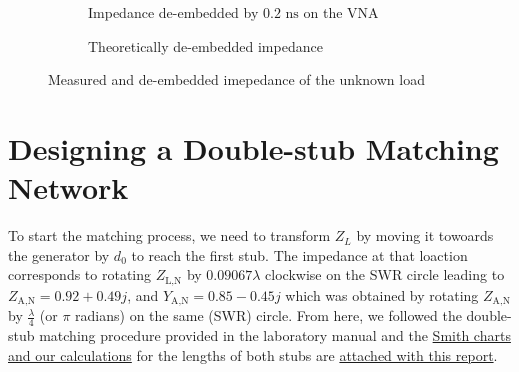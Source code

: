 \documentclass[10pt]{article}
\begin{document}
\begin{figure}[ht]
\begin{subfigure}[b]{0.45\textwidth}
    \caption{Impedance de-embedded by $0.2\text{ ns}$ on the VNA}
  \end{subfigure}
  \begin{subfigure}[b]{0.37\textwidth}
    \caption{Theoretically de-embedded impedance}
  \end{subfigure}
  \caption{Measured and de-embedded imepedance of the unknown load}
  \label{deembedding_load}
\end{figure}

\section{Designing a Double-stub Matching Network}

To start the matching process, we need to transform $Z_L$ by moving it towoards the generator by $d_0$ to reach the
first stub. The impedance at that loaction corresponds to rotating $Z_\text{L,N}$ by $0.09067\lambda$ clockwise on the 
SWR circle leading to $Z_\text{A,N} = 0.92 + 0.49j$, and $Y_\text{A,N} = 0.85 - 0.45j$ which was obtained by 
rotating $Z_\text{A,N}$ by $\frac{\lambda}{4}$ (or $\pi$ radians) on the same (SWR) circle. From here, we 
followed the double-stub matching procedure provided in the laboratory manual and the \underline{Smith charts and our 
calculations} for the lengths of both stubs are \underline{attached with this report}.
\end{document}
